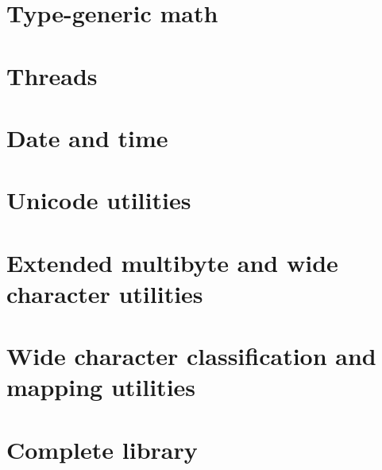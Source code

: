 \section{Type-generic math }


\section{Threads }


\section{Date and time }


\section{Unicode utilities }


\section{Extended multibyte and wide character utilities }


\section{Wide character classification and mapping utilities }


\section{Complete library }

